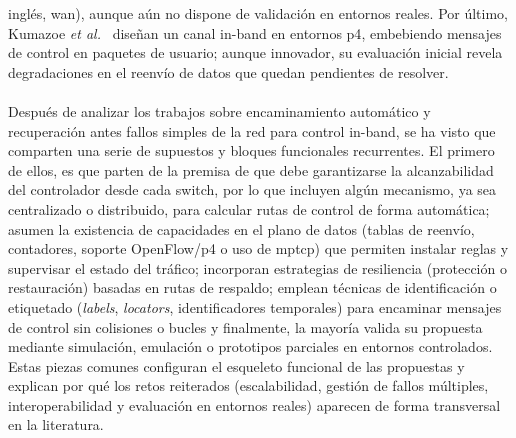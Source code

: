 inglés, \gls{wan}), aunque aún no dispone de validación en entornos reales.  Por último, Kumazoe \textit{et al.}~\cite{Kumazoe22} diseñan un canal in-band en entornos \gls{p4}, embebiendo mensajes de control en paquetes de usuario; aunque innovador, su evaluación inicial revela degradaciones en el reenvío de datos que quedan pendientes de resolver.\\
\\
Después de analizar los trabajos sobre encaminamiento automático y recuperación antes fallos simples de la red para control in-band, se ha visto que comparten una serie de supuestos y bloques funcionales recurrentes. El primero de ellos, es que parten de la premisa de que debe garantizarse la alcanzabilidad del controlador desde cada switch, por lo que incluyen algún mecanismo, ya sea centralizado o distribuido, para calcular rutas de control de forma automática; asumen la existencia de capacidades en el plano de datos (tablas de reenvío, contadores, soporte OpenFlow/\gls{p4} o uso de \gls{mptcp}) que permiten instalar reglas y supervisar el estado del tráfico; incorporan estrategias de resiliencia (protección o restauración) basadas en rutas de respaldo; emplean técnicas de identificación o etiquetado (\textit{labels}, \textit{locators}, identificadores temporales) para encaminar mensajes de control sin colisiones o bucles y finalmente, la mayoría valida su propuesta mediante simulación, emulación o prototipos parciales en entornos controlados. Estas piezas comunes configuran el esqueleto funcional de las propuestas y explican por qué los retos reiterados (escalabilidad, gestión de fallos múltiples, interoperabilidad y evaluación en entornos reales) aparecen de forma transversal en la literatura.\\
\\
